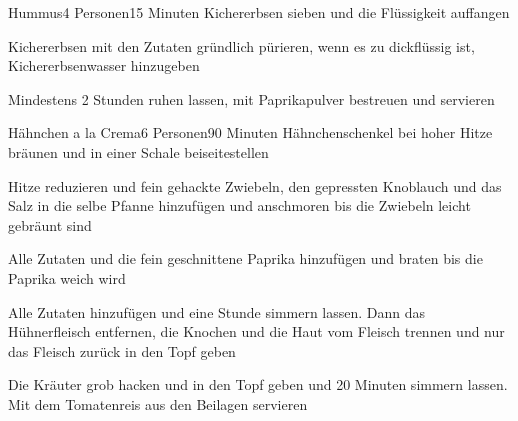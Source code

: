
\begin{recipe}{Hummus}{4 Personen}{15 Minuten}
Kichererbsen sieben und die Flüssigkeit auffangen

Kichererbsen mit den Zutaten gründlich pürieren, wenn es zu dickflüssig ist, Kichererbsenwasser hinzugeben

Mindestens 2 Stunden ruhen lassen, mit Paprikapulver bestreuen und servieren
\end{recipe}


\begin{recipe}{Hähnchen a la Crema}{6 Personen}{90 Minuten}
Hähnchenschenkel bei hoher Hitze bräunen und in einer Schale beiseitestellen 

Hitze reduzieren und fein gehackte Zwiebeln, den gepressten Knoblauch und das Salz in die selbe Pfanne hinzufügen und anschmoren bis die Zwiebeln leicht gebräunt sind

Alle Zutaten und die fein geschnittene Paprika hinzufügen und braten bis die Paprika weich wird

Alle Zutaten hinzufügen und eine Stunde simmern lassen. Dann das Hühnerfleisch entfernen, die Knochen und die Haut vom Fleisch trennen und nur das Fleisch zurück in den Topf geben

Die Kräuter grob hacken und in den Topf geben und 20 Minuten simmern lassen. Mit dem Tomatenreis aus den Beilagen servieren
\end{recipe}


